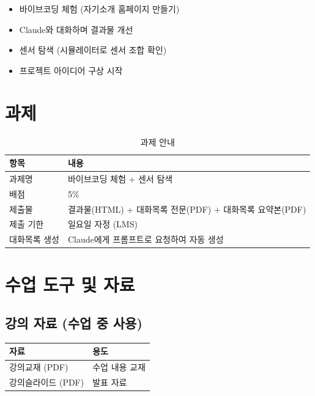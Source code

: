 \documentclass[11pt, a4paper]{article}
\begin{document}
\begin{itemize}[leftmargin=1.5em]
\item 바이브코딩 체험 (자기소개 홈페이지 만들기)
\item Claude와 대화하며 결과물 개선
\item 센서 탐색 (시뮬레이터로 센서 조합 확인)
\item 프로젝트 아이디어 구상 시작
\end{itemize}

\section{과제}

\begin{table}[H]\centering
\caption{과제 안내}
\begin{tabular}{ll}\toprule
\textbf{항목} & \textbf{내용} \\\midrule
과제명 & 바이브코딩 체험 + 센서 탐색 \\
배점 & 5\% \\
제출물 & 결과물(HTML) + 대화목록 전문(PDF) + 대화목록 요약본(PDF) \\
제출 기한 & 일요일 자정 (LMS) \\
대화목록 생성 & Claude에게 프롬프트로 요청하여 자동 생성 \\
\bottomrule
\end{tabular}
\end{table}

\section{수업 도구 및 자료}

\subsection{강의 자료 (수업 중 사용)}

\begin{table}[H]\centering
\begin{tabular}{ll}\toprule
\textbf{자료} & \textbf{용도} \\\midrule
강의교재 (PDF) & 수업 내용 교재 \\
강의슬라이드 (PDF) & 발표 자료 \\
\bottomrule
\end{tabular}
\end{table}
\end{document}
